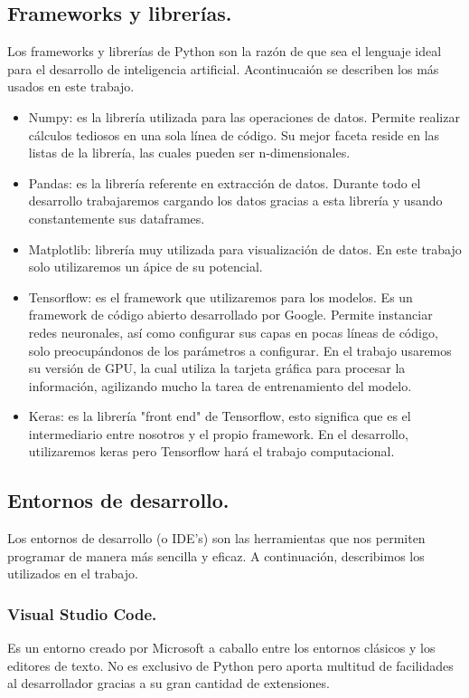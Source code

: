 \documentclass[a4paper,11pt]{article}
\begin{document}
\subsection{Frameworks y librerías.}
Los frameworks y librerías de Python son la razón de que sea el lenguaje ideal para el desarrollo de inteligencia artificial. Acontinucaión se describen los más usados en este trabajo.
\begin{itemize}
\item Numpy: es la librería utilizada para las operaciones de datos. Permite realizar cálculos tediosos en una sola línea de código. Su mejor faceta reside en las listas de la librería, las cuales pueden ser n-dimensionales.
\item Pandas: es la librería referente en extracción de datos. Durante todo el desarrollo trabajaremos cargando los datos gracias a esta librería y usando constantemente sus dataframes.
\item Matplotlib: librería muy utilizada para visualización de datos. En este trabajo solo utilizaremos un ápice de su potencial.
\item Tensorflow: es el framework que utilizaremos para los modelos. Es un framework de código abierto desarrollado por Google. Permite instanciar redes neuronales, así como configurar sus capas en pocas líneas de código, solo preocupándonos de los parámetros a configurar. En el trabajo usaremos su versión de GPU, la cual utiliza la tarjeta gráfica para procesar la información, agilizando mucho la tarea de entrenamiento del modelo.
\item Keras: es la librería "front end"  de Tensorflow, esto significa que es el intermediario entre nosotros y el propio framework. En el desarrollo, utilizaremos keras pero Tensorflow hará el trabajo  computacional.
\end{itemize}

\subsection{Entornos de desarrollo.}
Los entornos de desarrollo (o IDE's) son las herramientas que nos permiten programar de manera más sencilla y eficaz. A continuación, describimos los utilizados en el trabajo.
\subsubsection{Visual Studio Code.}
Es un entorno creado por Microsoft a caballo entre los entornos clásicos y los editores de texto. No es exclusivo de Python pero aporta multitud de facilidades al desarrollador gracias a su gran cantidad de extensiones.
\end{document}
